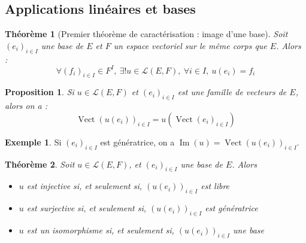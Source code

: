 \documentclass[french]{book}
\theoremstyle{plain}
\newtheorem{thm}{Théorème}[chapter]
\newtheorem{prop}{Proposition}[chapter]
\theoremstyle{definition}
\newtheorem{exa}{Exemple}[chapter]
\theoremstyle{remark}
\DeclareMathOperator{\vect}{Vect}
\DeclareMathOperator{\im}{Im}
\begin{document}
\subsection{Applications linéaires et bases} %
\begin{thm}[Premier théorème de caractérisation : image d'une base]
	Soit $(e_i)_{i\in I}$ une base de $E$ et $F$ un espace vectoriel sur le même corps que $E$. Alors : $$\forall (f_i)_{i\in I}\in F^I,\ \exists!u\in\mathcal{L}(E,F),\ \forall i\in I,\ u(e_i)=f_i$$
\end{thm}
\begin{prop}
	Si $u\in\mathcal{L}(E,F)$ et $(e_i)_{i\in I}$ est une famille de vecteurs de $E$, alors on a : $$\vect(u(e_i))_{i\in I}=u\left(\vect(e_i)_{i\in I}\right)$$
\end{prop}
\begin{exa}
	Si $(e_i)_{i\in I}$ est génératrice, on a $\im(u)=\vect(u(e_i))_{i\in I}$.
\end{exa}
\begin{thm}
	Soit $u\in\mathcal{L}(E,F)$, et $(e_i)_{i\in I}$ une base de $E$. Alors
	\begin{itemize}
		\item $u$ est injective si, et seulement si, $(u(e_i))_{i\in I}$ est libre
		\item $u$ est surjective si, et seulement si, $(u(e_i))_{i\in I}$ est génératrice
		\item $u$ est un isomorphisme si, et seulement si, $(u(e_i))_{i\in I}$ une base
	\end{itemize}
\end{thm}
\end{document}
